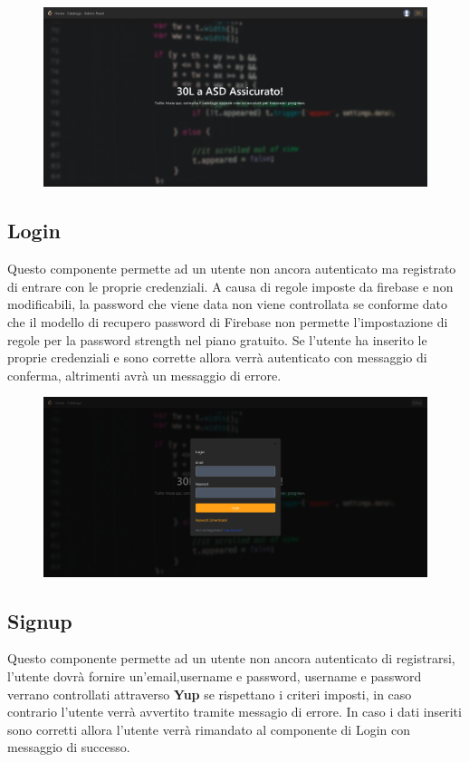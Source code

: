 \documentclass[11pt, a4paper]{article}
\theoremstyle{definition}
\begin{document}
\begin{figure}[H]
  \centering
  \includegraphics[width=\textwidth]{materiale/sito/Home.png}
\end{figure}

\subsection{Login}
Questo componente permette ad un utente non ancora autenticato ma registrato di entrare con le proprie credenziali.
A causa di regole imposte da firebase e non modificabili,
la password che viene data non viene controllata se conforme dato che il modello
di recupero password di Firebase non permette l'impostazione di regole per la password strength nel piano gratuito.
Se l'utente ha inserito le proprie credenziali e sono corrette allora verrà autenticato con messaggio di conferma,
altrimenti avrà un messaggio di errore.

\begin{figure}[H]
  \centering
  \includegraphics[width=\textwidth]{materiale/sito/Login.png}
\end{figure}

\subsection{Signup}
Questo componente permette ad un utente non ancora autenticato di registrarsi, l'utente dovrà fornire un'email,username e password, username e password verrano controllati attraverso \textbf{Yup} se rispettano i criteri imposti, in caso contrario l'utente verrà avvertito tramite messagio di errore.
In caso i dati inseriti sono corretti allora l'utente verrà rimandato al componente di Login con messaggio di successo.\\\\
\end{document}
